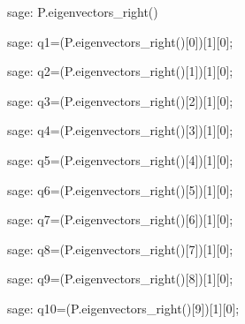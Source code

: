 \begin{sagecommandline}[\textwidth]
    sage: P.eigenvectors_right()
\end{sagecommandline}
    
\begin{sagecommandline}
    sage: q1=(P.eigenvectors_right()[0])[1][0];
\end{sagecommandline}

\begin{sagecommandline}
    sage: q2=(P.eigenvectors_right()[1])[1][0];
\end{sagecommandline}

\begin{sagecommandline}
    sage: q3=(P.eigenvectors_right()[2])[1][0];
\end{sagecommandline}

\begin{sagecommandline}
    sage: q4=(P.eigenvectors_right()[3])[1][0];
\end{sagecommandline}

\begin{sagecommandline}
    sage: q5=(P.eigenvectors_right()[4])[1][0];
\end{sagecommandline}

\begin{sagecommandline}
    sage: q6=(P.eigenvectors_right()[5])[1][0];
\end{sagecommandline}

\begin{sagecommandline}
    sage: q7=(P.eigenvectors_right()[6])[1][0];
\end{sagecommandline}

\begin{sagecommandline}
    sage: q8=(P.eigenvectors_right()[7])[1][0];
\end{sagecommandline}

\begin{sagecommandline}
    sage: q9=(P.eigenvectors_right()[8])[1][0];
\end{sagecommandline}

\begin{sagecommandline}
    sage: q10=(P.eigenvectors_right()[9])[1][0];
\end{sagecommandline}

